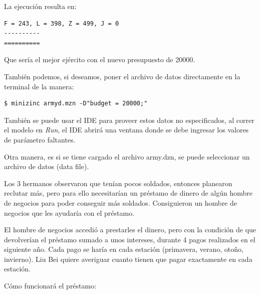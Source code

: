 \documentclass[12pt]{article}
\begin{document}
\begin{justify}
La ejecución resulta en:
\end{justify}

\begin{Verbatim}
F = 243, L = 398, Z = 499, J = 0
----------
==========
\end{Verbatim}

\begin{justify}
Que sería el mejor ejército con el nuevo presupuesto de 20000.
\end{justify}

\begin{justify}
También podemos, si deseamos, poner el archivo de datos directamente en la terminal de la manera:
\end{justify}

\begin{Verbatim}
$ minizinc armyd.mzn -D"budget = 20000;"
\end{Verbatim}

\begin{justify}
También se puede usar el IDE para proveer estos datos no especificados, al correr el modelo en \textit{Run}, el IDE abrirá una ventana donde se debe ingresar los valores de parámetro faltantes.
\end{justify}

\begin{justify}
Otra manera, es si se tiene cargado el archivo army.dzn, se puede seleccionar un archivo de datos (data file).
\end{justify}

\begin{justify}
Los 3 hermanos observaron que tenían pocos soldados, entonces planearon reclutar más, pero para ello necesitarían un préstamo de dinero de algún hombre de negocios para poder conseguir más soldados. Consiguieron un hombre de negocios que les ayudaría con el préstamo.
\end{justify}

\begin{justify}
El hombre de negocios accedió a prestarles el dinero, pero con la condición de que devolverían el préstamo sumado a unos intereses, durante 4 pagos realizados en el siguiente año. Cada pago se haría en cada estación (primavera, verano, otoño, invierno). Liu Bei quiere averiguar cuanto tienen que pagar exactamente en cada estación. 
\end{justify}

\begin{justify}
Cómo funcionará el préstamo:
\end{justify}
\end{document}
